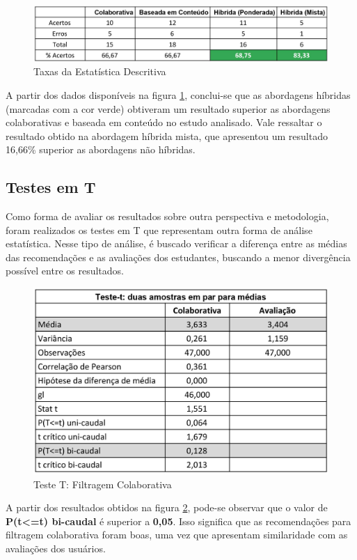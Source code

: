 \begin{figure}[H]
	\centering
	\includegraphics[width=.9\linewidth]{imagens/analiseDescritivaTaxas.jpg}
	\caption[Taxas da Estatística Descritiva]{Taxas da Estatística Descritiva}
    \label{fig:analiseDescritivaTaxas}
\end{figure}

A partir dos dados disponíveis na figura \ref{fig:analiseDescritivaTaxas}, conclui-se que as abordagens híbridas (marcadas com a cor verde) obtiveram um resultado superior as abordagens colaborativas e baseada em conteúdo no estudo analisado. Vale ressaltar o resultado obtido na abordagem híbrida mista, que apresentou um resultado 16,66\% superior as abordagens não híbridas.

\subsection{Testes em T}

Como forma de avaliar os resultados sobre outra perspectiva e metodologia, foram realizados os testes em T que representam outra forma de análise estatística. Nesse tipo de análise, é buscado verificar a diferença entre as médias das recomendações e as avaliações dos estudantes, buscando a menor divergência possível entre os resultados.

\begin{figure}[H]
	\centering
	\includegraphics[width=.7\linewidth]{imagens/testeTColaborativa.jpg}
	\caption[Teste T: Filtragem Colaborativa]{Teste T: Filtragem Colaborativa}
    \label{fig:testeTColaborativa}
\end{figure}

A partir dos resultados obtidos na figura \ref{fig:testeTColaborativa}, pode-se observar que o valor de \textbf{P(t<=t) bi-caudal} é superior a \textbf{0,05}. Isso significa que as recomendações para filtragem colaborativa foram boas, uma vez que apresentam similaridade com as avaliações dos usuários.

